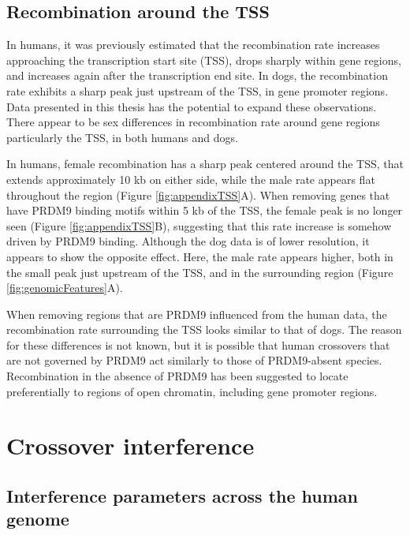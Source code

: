 \subsection{Recombination around the TSS}

In humans, it was previously estimated that the recombination rate increases approaching the transcription start site (TSS), drops sharply within gene regions, and increases again after the transcription end site\cite{Mcvean2004,Myers2005,hapmap2007,Spencer2006,Kong2010}.
In dogs, the recombination rate exhibits a sharp peak just upstream of the TSS, in gene promoter regions\cite{Auton2013}.
Data presented in this thesis has the potential to expand these observations.
There appear to be sex differences in recombination rate around gene regions particularly the TSS, in both humans and dogs.

In humans, female recombination has a sharp peak centered around the TSS, that extends approximately 10 kb on either side, while the male rate appears flat throughout the region (Figure \ref{fig:appendixTSS}A).
When removing genes that have PRDM9 binding motifs within 5 kb of the TSS, the female peak is no longer seen (Figure \ref{fig:appendixTSS}B), suggesting that this rate increase is somehow driven by PRDM9 binding.
Although the dog data is of lower resolution, it appears to show the opposite effect.
Here, the male rate appears higher, both in the small peak just upstream of the TSS, and in the surrounding region (Figure \ref{fig:genomicFeatures}A).

When removing regions that are PRDM9 influenced from the human data, the recombination rate surrounding the TSS looks similar to that of dogs.
The reason for these differences is not known, but it is possible that human crossovers that are not governed by PRDM9 act similarly to those of PRDM9-absent species.
Recombination in the absence of PRDM9 has been suggested to locate preferentially to regions of open chromatin, including gene promoter regions\cite{Auton2013,Singhal2015,Lam2015}.

\section{Crossover interference}

\subsection{Interference parameters across the human genome}

